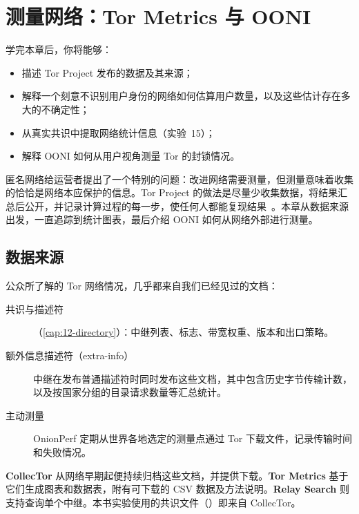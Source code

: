 \chapter{测量网络：Tor Metrics 与 OONI}\label{cap:24-metrics}

\begin{obiettivi}
学完本章后，你将能够：
\begin{itemize}[nosep]
  \item 描述 Tor Project 发布的数据及其来源；
  \item 解释一个刻意不识别用户身份的网络如何估算用户数量，以及这些估计存在多大的不确定性；
  \item 从真实共识中提取网络统计信息（实验~15）；
  \item 解释 OONI 如何从用户视角测量 Tor 的封锁情况。
\end{itemize}
\end{obiettivi}

匿名网络给运营者提出了一个特别的问题：改进网络需要测量，但测量意味着收集的恰恰是网络本应保护的信息。Tor Project 的做法是尽量少收集数据，将结果汇总后公开，并记录计算过程的每一步，使任何人都能复现结果~\cite{metricsreproducible}。本章从数据来源出发，一直追踪到统计图表，最后介绍 OONI 如何从网络外部进行测量。

\section{数据来源}\label{sec:metrics-fonti}

公众所了解的 Tor 网络情况，几乎都来自我们已经见过的文档：
\begin{description}
  \item[共识与描述符]（\cref{cap:12-directory}）：中继列表、标志、带宽权重、版本和出口策略。
  \item[额外信息描述符（extra-info）] 中继在发布普通描述符时同时发布这些文档，其中包含历史字节传输计数，以及按国家分组的目录请求数量等汇总统计。
  \item[主动测量] OnionPerf 定期从世界各地选定的测量点通过 Tor 下载文件，记录传输时间和失败情况。
\end{description}
\textbf{CollecTor} 从网络早期起便持续归档这些文档，并提供下载。\textbf{Tor Metrics} 基于它们生成图表和数据表，附有可下载的 CSV 数据及方法说明。\textbf{Relay Search} 则支持查询单个中继。本书实验使用的共识文件（）即来自 CollecTor。

